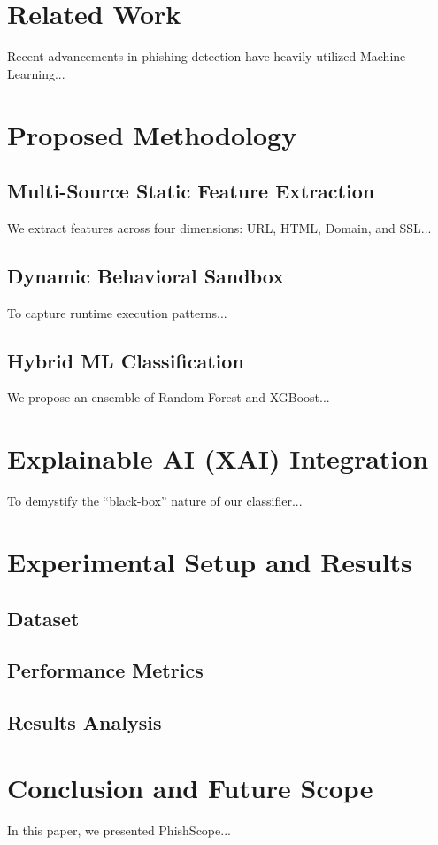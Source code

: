 \documentclass[conference]{IEEEtran}
\begin{document}
\section{Related Work}
Recent advancements in phishing detection have heavily utilized Machine Learning...

\section{Proposed Methodology}
\subsection{Multi-Source Static Feature Extraction}
We extract features across four dimensions: URL, HTML, Domain, and SSL...

\subsection{Dynamic Behavioral Sandbox}
To capture runtime execution patterns...

\subsection{Hybrid ML Classification}
We propose an ensemble of Random Forest and XGBoost...

\section{Explainable AI (XAI) Integration}
To demystify the ``black-box'' nature of our classifier...

\section{Experimental Setup and Results}
\subsection{Dataset}
\subsection{Performance Metrics}
\subsection{Results Analysis}

\section{Conclusion and Future Scope}
In this paper, we presented PhishScope...



\end{document}
